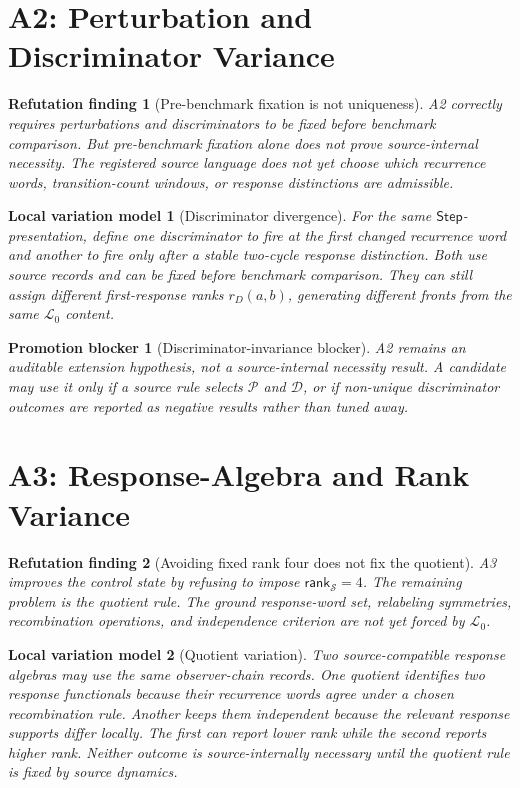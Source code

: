 \documentclass[11pt]{article}
\newcommand{\Step}{\mathsf{Step}}
\newcommand{\Rank}{\mathsf{rank}_{\mathcal{S}}}
\newcommand{\Lang}{\mathcal{L}_{0}}
\newtheorem{finding}{Refutation finding}
\newtheorem{countermodel}{Local variation model}
\newtheorem{blocker}{Promotion blocker}
\begin{document}
\section{A2: Perturbation and Discriminator Variance}

\begin{finding}[Pre-benchmark fixation is not uniqueness]
A2 correctly requires perturbations and discriminators to be fixed before
benchmark comparison. But pre-benchmark fixation alone does not prove
source-internal necessity. The registered source language does not yet choose
which recurrence words, transition-count windows, or response distinctions
are admissible.
\end{finding}

\begin{countermodel}[Discriminator divergence]
For the same \(\Step\)-presentation, define one discriminator to fire at the
first changed recurrence word and another to fire only after a stable
two-cycle response distinction. Both use source records and can be fixed
before benchmark comparison. They can still assign different first-response
ranks \(r_D(a,b)\), generating different fronts from the same \(\Lang\)
content.
\end{countermodel}

\begin{blocker}[Discriminator-invariance blocker]
A2 remains an auditable extension hypothesis, not a source-internal
necessity result. A candidate may use it only if a source rule selects
\(\mathcal{P}\) and \(\mathcal{D}\), or if non-unique discriminator outcomes
are reported as negative results rather than tuned away.
\end{blocker}

\section{A3: Response-Algebra and Rank Variance}

\begin{finding}[Avoiding fixed rank four does not fix the quotient]
A3 improves the control state by refusing to impose \(\Rank=4\). The
remaining problem is the quotient rule. The ground response-word set,
relabeling symmetries, recombination operations, and independence criterion
are not yet forced by \(\Lang\).
\end{finding}

\begin{countermodel}[Quotient variation]
Two source-compatible response algebras may use the same observer-chain
records. One quotient identifies two response functionals because their
recurrence words agree under a chosen recombination rule. Another keeps them
independent because the relevant response supports differ locally. The first
can report lower rank while the second reports higher rank. Neither outcome
is source-internally necessary until the quotient rule is fixed by source
dynamics.
\end{countermodel}
\end{document}
